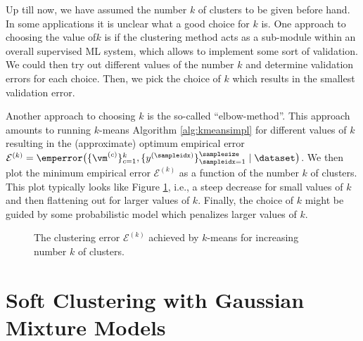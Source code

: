 \documentclass[12pt]{report}
\begin{document}
Up till now, we have assumed the number $k$ of clusters 
to be given before hand. In some applications it is unclear
what a good choice for $k$ is. One approach to choosing 
the value of$k$ is if the clustering method acts as a sub-module 
within an overall supervised ML system, which allows to 
implement some sort of validation. We could then try out 
different values of the number $k$ and determine validation 
errors for each choice. Then, we pick the choice of $k$ which 
results in the smallest validation error. 

Another approach to choosing $k$ is the so-called ``elbow-method''. 
This approach amounts to running $k$-means Algorithm \ref{alg:kmeansimpl} 
for different values of $k$ resulting in the (approximate) optimum 
empirical error$\mathcal{E}^{(k)} = \emperror \big( \{\vm^{(c)}\}_{c=1}^{k},\{y^{(\sampleidx)}\}_{\sampleidx=1}^{\samplesize} \mid \dataset \big)$. 
We then plot the minimum empirical error $\mathcal{E}^{(k)}$ as a 
function of the number $k$ of clusters. This plot typically looks 
like Figure \ref{fig_ellbow}, i.e., a steep decrease for small values 
of $k$ and then flattening out for larger values of $k$. Finally, the 
choice of $k$ might be guided by some probabilistic model which 
penalizes larger values of $k$. 


\begin{figure}
\begin{center}
\end{center}
\caption{The clustering error $\mathcal{E}^{(k)}$ achieved by $k$-means for increasing number $k$ of clusters.}
\label{fig_ellbow}
\end{figure}




\section{Soft Clustering with Gaussian Mixture Models}
\label{sec_soft_clustering}
\end{document}
